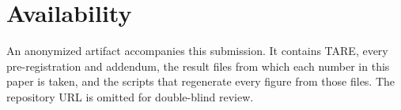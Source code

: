 \documentclass[letterpaper,twocolumn,10pt]{article}
\theoremstyle{definition}
\newcommand{\sys}{TARE\xspace}
\begin{document}
\section*{Availability}
An anonymized artifact accompanies this submission. It contains \sys, every pre-registration and addendum, the result files
from which each number in this paper is taken, and the scripts that regenerate every figure from those files. The repository
URL is omitted for double-blind review.



\end{document}

